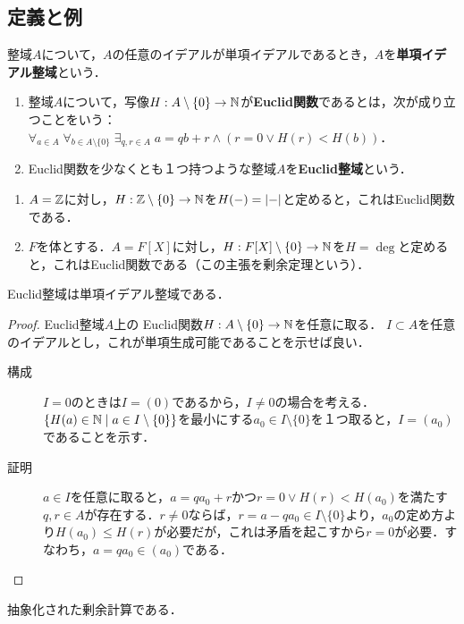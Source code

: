 \documentclass[uplatex,dvipdfmx]{jsreport}
\begin{document}
\subsection{定義と例}

\begin{definition}
    整域$A$について，$A$の任意のイデアルが単項イデアルであるとき，$A$を\textbf{単項イデアル整域}という．
\end{definition}
\begin{definition}\mbox{}
    \begin{enumerate}
        \item 整域$A$について，写像$H:A\setminus\{0\}\to\mathbb{N}$が\textbf{Euclid関数}であるとは，次が成り立つことをいう：$\forall_{a\in A}\;\forall_{b\in A\setminus\{0\}}\;\exists_{q,r\in A}\;a=qb+r\land(r=0\lor H(r)<H(b))$．
        \item Euclid関数を少なくとも１つ持つような整域$A$を\textbf{Euclid整域}という．
    \end{enumerate}
\end{definition}
\begin{example}[Euclid整域]\mbox{}\label{exp-Euclidean-ideal}
    \begin{enumerate}
        \item $A=\mathbb{Z}$に対し，$H:\mathbb{Z}\setminus\{0\}\to\mathbb{N}$を$H(-)=\lvert-\rvert$と定めると，これはEuclid関数である．
        \item $F$を体とする．$A=F[X]$に対し，$H:F[X]\setminus\{0\}\to\mathbb{N}$を$H=\deg$と定めると，これはEuclid関数である（この主張を剰余定理という）．
    \end{enumerate}
\end{example}

\begin{proposition}\label{prop-Euclidean-ideal-then-PID}
    Euclid整域は単項イデアル整域である．
\end{proposition}
\begin{proof}
    Euclid整域$A$上の
    Euclid関数$H:A\setminus\{0\}\to\mathbb{N}$を任意に取る．
    $I\subset A$を任意のイデアルとし，これが単項生成可能であることを示せば良い．
    \begin{description}
        \item[構成] $I=0$のときは$I=(0)$であるから，$I\ne 0$の場合を考える．$\left\{H(a)\in\mathbb{N}\mid a\in I\setminus\{0\}\right\}$を最小にする$a_0\in I\setminus\{0\}$を１つ取ると，$I=(a_0)$であることを示す．
        \item[証明] $a\in I$を任意に取ると，$a=qa_0+r$かつ$r=0\lor H(r)<H(a_0)$を満たす$q,r\in A$が存在する．$r\ne 0$ならば，$r=a-qa_0\in I\setminus\{0\}$より，$a_0$の定め方より$H(a_0)\le H(r)$が必要だが，これは矛盾を起こすから$r=0$が必要．すなわち，$a=qa_0\in (a_0)$である．
    \end{description}
\end{proof}
\begin{remarks}
    抽象化された剰余計算である．
\end{remarks}
\end{document}
